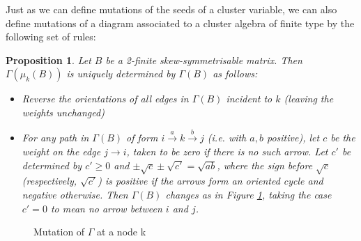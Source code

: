 \documentclass[11pt]{amsart}
\newtheorem{prop}[thm]{Proposition}
\theoremstyle{definition}
\begin{document}
Just as we can define mutations of the seeds of a cluster variable, we can also define mutations of a diagram associated to a cluster algebra of finite type by the following set of rules:
\begin{prop}\cite{FZ03}
Let $B$ be a 2-finite skew-symmetrisable matrix. Then $\Gamma(\mu_k(B))$ is uniquely determined by $\Gamma(B)$ as follows:
\begin{itemize}
\item Reverse the orientations of all edges in $\Gamma(B)$ incident to $k$ (leaving the weights unchanged)
\item For any path in $\Gamma(B)$ of form $i \xrightarrow{a} k \xrightarrow{b} j$ (i.e. with $a,b$ positive), let $c$ be the weight on the edge $j \rightarrow i$, taken to be zero if there is no such arrow. Let $c'$ be determined by $c'\geq 0$ and
$\pm \sqrt{c} \pm \sqrt{c'} = \sqrt{ab}$, 
where the sign before $\sqrt{c}$ (respectively, $\sqrt{c'}$) is positive if the arrows form an oriented cycle and negative otherwise. Then $\Gamma(B)$ changes as in Figure \ref{mutation}, taking the case $c' = 0$ to mean no arrow between $i$ and $j$.
\end{itemize}
\end{prop}

\begin{figure}
\begin{center}
   \end{center}

\caption{Mutation of $\Gamma$ at a node k}\label{mutation}
\end{figure}
   
\end{document}
